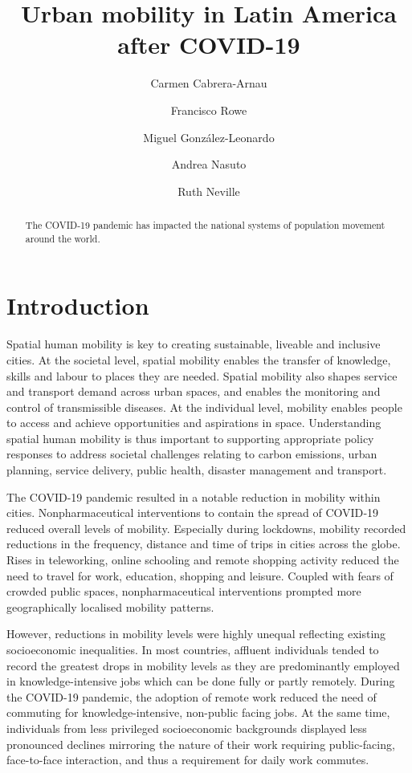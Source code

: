 \documentclass[
  11pt,
]{article}
\title{\textbf{Urban mobility in Latin America after COVID-19}}
\author[1]{Carmen Cabrera-Arnau}
\author[1]{Francisco Rowe}
\author[2]{Miguel González-Leonardo}
\author[1]{Andrea Nasuto}
\author[1]{Ruth Neville}
\affil[1]{Geographic Data Science Lab, Department of Geography and
Planning, University of Liverpool, Liverpool, UK}
\affil[2]{Centre for Demographic Urban and Environmental Studies, El
Colegio de México, Ciudad de México, México}
\date{}
\begin{document}
\maketitle
\begin{abstract}
The COVID‐19 pandemic has impacted the national systems of population
movement around the world.
\end{abstract}

\section{Introduction}\label{sec-intro}

Spatial human mobility is key to creating sustainable, liveable and
inclusive cities. At the societal level, spatial mobility enables the
transfer of knowledge, skills and labour to places they are needed.
Spatial mobility also shapes service and transport demand across urban
spaces, and enables the monitoring and control of transmissible
diseases. At the individual level, mobility enables people to access and
achieve opportunities and aspirations in space. Understanding spatial
human mobility is thus important to supporting appropriate policy
responses to address societal challenges relating to carbon emissions,
urban planning, service delivery, public health, disaster management and
transport.

The COVID-19 pandemic resulted in a notable reduction in mobility within
cities. Nonpharmaceutical interventions to contain the spread of
COVID‐19 reduced overall levels of mobility. Especially during
lockdowns, mobility recorded reductions in the frequency, distance and
time of trips in cities across the globe. Rises in teleworking, online
schooling and remote shopping activity reduced the need to travel for
work, education, shopping and leisure. Coupled with fears of crowded
public spaces, nonpharmaceutical interventions prompted more
geographically localised mobility patterns.

However, reductions in mobility levels were highly unequal reflecting
existing socioeconomic inequalities. In most countries, affluent
individuals tended to record the greatest drops in mobility levels as
they are predominantly employed in knowledge-intensive jobs which can be
done fully or partly remotely. During the COVID-19 pandemic, the
adoption of remote work reduced the need of commuting for
knowledge-intensive, non-public facing jobs. At the same time,
individuals from less privileged socioeconomic backgrounds displayed
less pronounced declines mirroring the nature of their work requiring
public-facing, face-to-face interaction, and thus a requirement for
daily work commutes.
\end{document}
